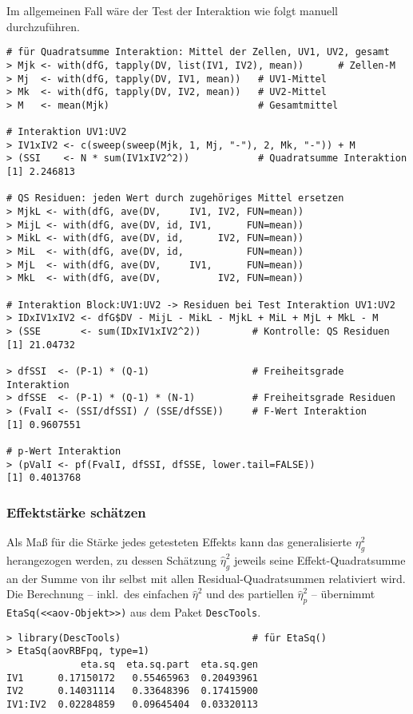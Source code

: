 Im allgemeinen Fall wäre der Test der Interaktion wie folgt manuell durchzuführen.
\begin{lstlisting}
# für Quadratsumme Interaktion: Mittel der Zellen, UV1, UV2, gesamt
> Mjk <- with(dfG, tapply(DV, list(IV1, IV2), mean))      # Zellen-M
> Mj  <- with(dfG, tapply(DV, IV1, mean))   # UV1-Mittel
> Mk  <- with(dfG, tapply(DV, IV2, mean))   # UV2-Mittel
> M   <- mean(Mjk)                          # Gesamtmittel

# Interaktion UV1:UV2
> IV1xIV2 <- c(sweep(sweep(Mjk, 1, Mj, "-"), 2, Mk, "-")) + M
> (SSI    <- N * sum(IV1xIV2^2))            # Quadratsumme Interaktion
[1] 2.246813

# QS Residuen: jeden Wert durch zugehöriges Mittel ersetzen
> MjkL <- with(dfG, ave(DV,     IV1, IV2, FUN=mean))
> MijL <- with(dfG, ave(DV, id, IV1,      FUN=mean))
> MikL <- with(dfG, ave(DV, id,      IV2, FUN=mean))
> MiL  <- with(dfG, ave(DV, id,           FUN=mean))
> MjL  <- with(dfG, ave(DV,     IV1,      FUN=mean))
> MkL  <- with(dfG, ave(DV,          IV2, FUN=mean))

# Interaktion Block:UV1:UV2 -> Residuen bei Test Interaktion UV1:UV2
> IDxIV1xIV2 <- dfG$DV - MijL - MikL - MjkL + MiL + MjL + MkL - M
> (SSE       <- sum(IDxIV1xIV2^2))         # Kontrolle: QS Residuen
[1] 21.04732

> dfSSI  <- (P-1) * (Q-1)                  # Freiheitsgrade Interaktion
> dfSSE  <- (P-1) * (Q-1) * (N-1)          # Freiheitsgrade Residuen
> (FvalI <- (SSI/dfSSI) / (SSE/dfSSE))     # F-Wert Interaktion
[1] 0.9607551

# p-Wert Interaktion
> (pValI <- pf(FvalI, dfSSI, dfSSE, lower.tail=FALSE))
[1] 0.4013768
\end{lstlisting}

\subsubsection{Effektstärke schätzen}

Als Maß für die Stärke jedes getesteten Effekts kann das generalisierte $\eta_{g}^{2}$ herangezogen werden, zu dessen Schätzung $\hat{\eta}_{g}^{2}$ jeweils seine Effekt-Quadratsumme an der Summe von ihr selbst mit allen Residual-Quadratsummen relativiert wird. Die Berechnung -- inkl.\ des einfachen $\hat{\eta}^{2}$ und des partiellen $\hat{\eta}_{p}^{2}$ -- übernimmt \lstinline!EtaSq(<<aov-Objekt>>)! aus dem Paket \lstinline!DescTools!.
\begin{lstlisting}
> library(DescTools)                       # für EtaSq()
> EtaSq(aovRBFpq, type=1)
             eta.sq  eta.sq.part  eta.sq.gen
IV1      0.17150172   0.55465963  0.20493961
IV2      0.14031114   0.33648396  0.17415900
IV1:IV2  0.02284859   0.09645404  0.03320113
\end{lstlisting}

